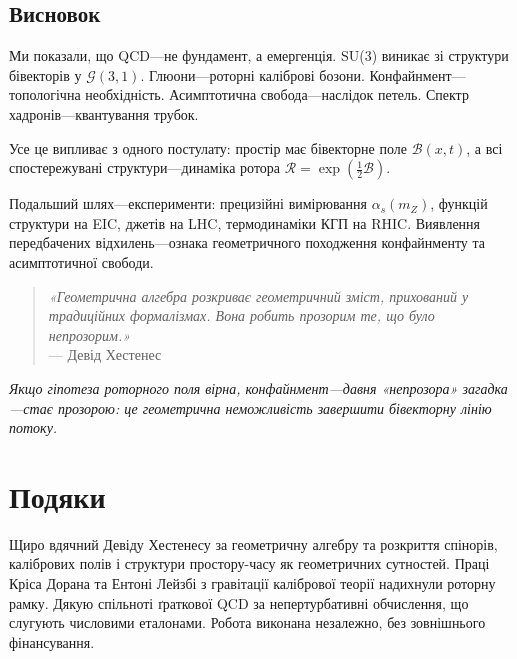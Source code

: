 \documentclass[11pt,a4paper]{article}
\newcommand{\Rotor}{\mathcal{R}}
\newcommand{\Biv}{\mathcal{B}}
\newcommand{\Cl}{\mathcal{G}}
\theoremstyle{definition}
\theoremstyle{plain}
\theoremstyle{remark}
\begin{document}
\subsection{Висновок}

Ми показали, що QCD—не фундамент, а емергенція. SU(3) виникає зі структури бівекторів у $\Cl(3,1)$. Глюони—роторні каліброві бозони. Конфайнмент—топологічна необхідність. Асимптотична свобода—наслідок петель. Спектр хадронів—квантування трубок.

Усе це випливає з одного постулату: простір має бівекторне поле $\Biv(x,t)$, а всі спостережувані структури—динаміка ротора $\Rotor=\exp(\frac{1}{2}\Biv)$.

Подальший шлях—експерименти: прецизійні вимірювання $\alpha_s(m_Z)$, функцій структури на EIC, джетів на LHC, термодинаміки КГП на RHIC. Виявлення передбачених відхилень—ознака геометричного походження конфайнменту та асимптотичної свободи.

\begin{quote}
\textit{«Геометрична алгебра розкриває геометричний зміст, прихований у традиційних формалізмах. Вона робить прозорим те, що було непрозорим.»}\\
— Девід Хестенес
\end{quote}

\noindent\textit{Якщо гіпотеза роторного поля вірна, конфайнмент—давня «непрозора» загадка—стає прозорою: це геометрична неможливість завершити бівекторну лінію потоку.}

\vspace{1em}

\section*{Подяки}

Щиро вдячний Девіду Хестенесу за геометричну алгебру та розкриття спінорів, калібрових полів і структури простору-часу як геометричних сутностей. Праці Кріса Дорана та Ентоні Лейзбі з гравітації калібрової теорії надихнули роторну рамку. Дякую спільноті ґраткової QCD за непертурбативні обчислення, що слугують числовими еталонами. Робота виконана незалежно, без зовнішнього фінансування.

\vspace{1em}
\end{document}
